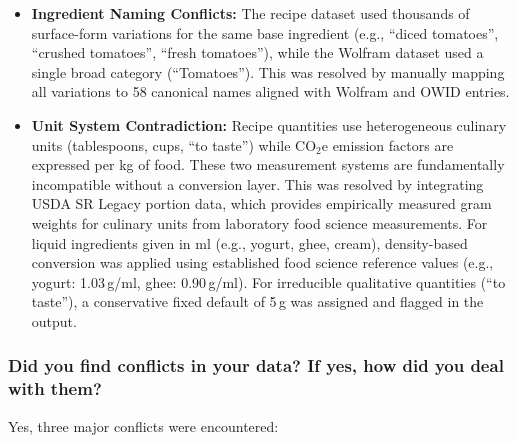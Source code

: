 \documentclass{article}
\newcommand{\question}[1]{#1}
\begin{document}
\begin{itemize}
    \item \textbf{Ingredient Naming Conflicts:} The recipe dataset used thousands of surface-form variations for the same base ingredient (e.g., ``diced tomatoes'', ``crushed tomatoes'', ``fresh tomatoes''), while the Wolfram dataset used a single broad category (``Tomatoes''). This was resolved by manually mapping all variations to 58 canonical names aligned with Wolfram and OWID entries.
    \item \textbf{Unit System Contradiction:} Recipe quantities use heterogeneous culinary units (tablespoons, cups, ``to taste'') while CO$_2$e emission factors are expressed per kg of food. These two measurement systems are fundamentally incompatible without a conversion layer. This was resolved by integrating USDA SR Legacy portion data, which provides empirically measured gram weights for culinary units from laboratory food science measurements. For liquid ingredients given in ml (e.g., yogurt, ghee, cream), density-based conversion was applied using established food science reference values (e.g., yogurt: 1.03\,g/ml, ghee: 0.90\,g/ml). For irreducible qualitative quantities (``to taste''), a conservative fixed default of 5\,g was assigned and flagged in the output.
\end{itemize}

\question{\subsubsection*{Did you find conflicts in your data? If yes, how did you deal with them?}}

Yes, three major conflicts were encountered:
\end{document}
